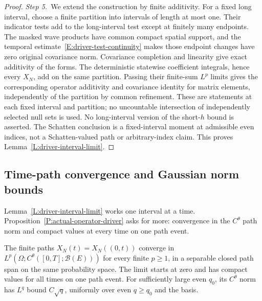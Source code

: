 \begin{proof}
  \medskip
  \noindent\textit{Step 5.~}We extend the construction by finite additivity.
  For a fixed long interval, choose a finite partition into intervals of length
  at most one. Their indicator tests add to the long-interval test except at
  finitely many endpoints. The masked wave products have common compact spatial
  support, and the temporal estimate~\eqref{E:driver-test-continuity} makes
  those endpoint changes have zero original covariance norm. Covariance
  completion and linearity give exact additivity of the forms. The deterministic
  statewise coefficient integrals, hence every $X_N$, add on the same partition.
  Passing their finite-sum $L^p$ limits gives the corresponding operator
  additivity and covariance identity for matrix elements, independently of the
  partition by common refinement. These are statements at each fixed interval
  and partition; no uncountable intersection of independently selected null sets
  is used. No long-interval version of the short-$h$ bound is asserted. The
  Schatten conclusion is a fixed-interval moment at admissible even indices, not
  a Schatten-valued path or arbitrary-index claim. This proves
  Lemma~\ref{L:driver-interval-limit}.
\end{proof}

\subsection{Time-path convergence and Gaussian norm bounds}

Lemma~\ref{L:driver-interval-limit} works one interval at a time.
Proposition~\ref{P:actual-operator-driver} asks for more: convergence in the
$C^\theta$ path norm and compact values at every time on one path event.

\begin{lemma}\label{L:driver-holder-limit}
  The finite paths $X_N(t) = X_N((0,t))$ converge in
  $L^p(\Omega;C^\theta([0,T];\mathcal{B}(E)))$ for every finite $p \ge 1$, in a
  separable closed path span on the same probability space. The limit starts at
  zero and has compact values for all times on one path event. For sufficiently
  large even $q_0$, its $C^\theta$ norm has $L^q$ bound $C\sqrt q$, uniformly
  over even $q \ge q_0$ and the basis.
\end{lemma}

